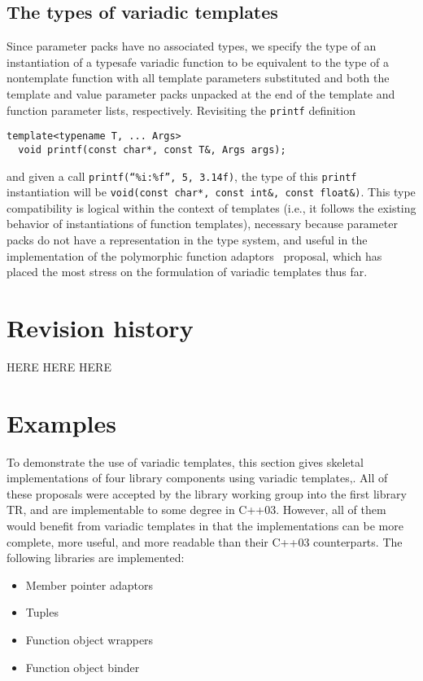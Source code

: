 \documentclass{article}
\begin{document}
\subsection{The types of variadic templates}
Since parameter packs have no associated types, we specify the
type of an instantiation of a typesafe variadic function to be equivalent
to the type of a nontemplate function with all template parameters
substituted and both the template and value parameter packs unpacked
at the end of the template and function parameter lists,
respectively. Revisiting the {\tt printf} definition

\begin{verbatim}
template<typename T, ... Args>
  void printf(const char*, const T&, Args args);
\end{verbatim}

and given a call {\tt printf(``\%i:\%f'', 5, 3.14f)}, the type of this
{\tt printf} instantiation will be {\tt void(const char*, const int\&,
  const float\&)}. This type compatibility is logical within the
context of templates (i.e., it follows the existing behavior of
instantiations of function templates), necessary because parameter
packs do not have a representation in the type system, and useful in the
implementation of the polymorphic function adaptors~\cite{Gregor02}
proposal, which has placed the most stress on the formulation of
variadic templates thus far.

\section{Revision history}
HERE HERE HERE

\section{Examples}
To demonstrate the use of variadic templates, this section gives
skeletal implementations of four library components using variadic
templates,. All of these proposals were accepted by the library
working group into the first library TR, and are implementable to some
degree in C++03. However, all of them would benefit from variadic
templates in that the implementations can be more complete, more
useful, and more readable than their C++03 counterparts. The following
libraries are implemented:

\begin{itemize}
\item Member pointer adaptors~\cite{Dimov03a}
\item Tuples~\cite{Jarvi02}
\item Function object wrappers~\cite{Gregor02}
\item Function object binder~\cite{Dimov03b}
\end{itemize}
\end{document}
